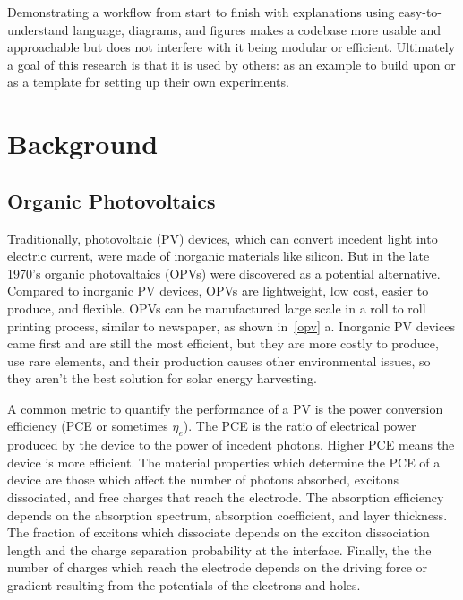 Demonstrating a workflow from start to finish with explanations using easy-to-understand language, diagrams, and figures makes a codebase more usable and approachable but does not interfere with it being modular or efficient.
Ultimately a goal of this research is that it is used by others: as an example to build upon or as a template for setting up their own experiments.

\section*{Background}

\subsection*{Organic Photovoltaics}



Traditionally, photovoltaic (PV) devices, which can convert incedent light into electric current, were made of inorganic materials like silicon.
But in the late 1970's organic photovaltaics (OPVs) were discovered as a potential alternative\cite{Tang1986b}.
Compared to inorganic PV devices, OPVs are lightweight, low cost, easier to produce, and flexible. 
OPVs can be manufactured large scale in a roll to roll printing process, similar to newspaper, as shown in~\autoref{opv} a\cite{Dou2013}.
Inorganic PV devices came first and are still the most efficient, but they are more costly to produce, use rare elements, and their production causes other environmental issues, so they aren't the best solution for solar energy harvesting. 

A common metric to quantify the performance of a PV is the power conversion efficiency (PCE or sometimes $\eta_{e}$).
The PCE is the ratio of electrical power produced by the device to the power of incedent photons.
Higher PCE means the device is more efficient.  
The material properties which determine the PCE of a device are those which affect the number of photons absorbed, excitons dissociated, and free charges that reach the electrode.
The absorption efficiency depends on the absorption spectrum, absorption coefficient, and layer thickness.
The fraction of excitons which dissociate depends on the exciton dissociation length and the charge separation probability at the interface.
Finally, the the number of charges which reach the electrode depends on the driving force or gradient resulting from the potentials of the electrons and holes\cite{Hoppe2004}.

